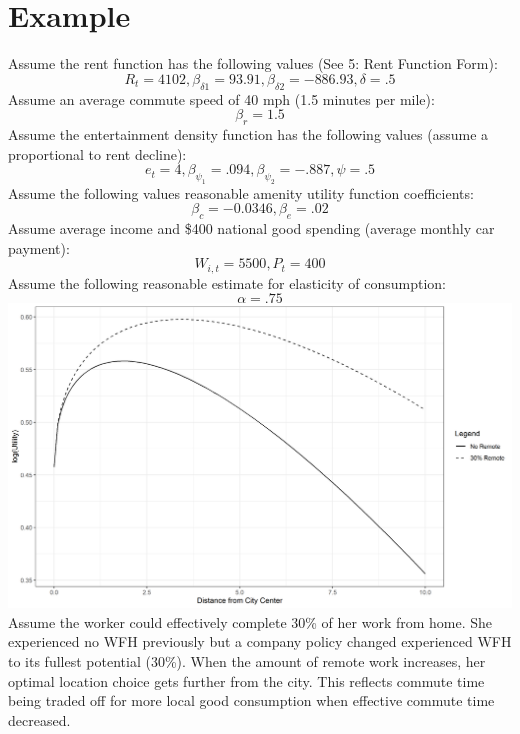\documentclass{article}
\begin{document}
\section{Example}
Assume the rent function has the following values (See 5: Rent Function Form):\\
$$R_{t} = 4102,  \beta_{\delta1} = 93.91, \beta_{\delta2} = -886.93, \delta = .5$$
Assume an average commute speed of 40 mph (1.5 minutes per mile):\\
$$\beta_r = 1.5$$
Assume the entertainment density function has the following values (assume a proportional to rent decline):\\
$$e_t = 4, \beta_{\psi_1} = .094, \beta_{\psi_2} = -.887, \psi = .5$$
Assume the following values reasonable amenity utility function coefficients:\\
$$\beta_c = -0.0346, \beta_e = .02$$
Assume average income and \$400 national good spending (average monthly car payment):\\
$$W_{i,t} = 5500, P_t = 400$$
Assume the following reasonable estimate for elasticity of consumption:\\
$$\alpha = .75$$
\includegraphics[scale=.5]{images/remote_effect.png}
Assume the worker could effectively complete 30\% of her work from home. She experienced no WFH previously but a company policy changed experienced WFH to its fullest potential (30\%). When the amount of remote work increases, her optimal location choice gets further from the city. This reflects commute time being traded off for more local good consumption when effective commute time decreased.
\end{document}
